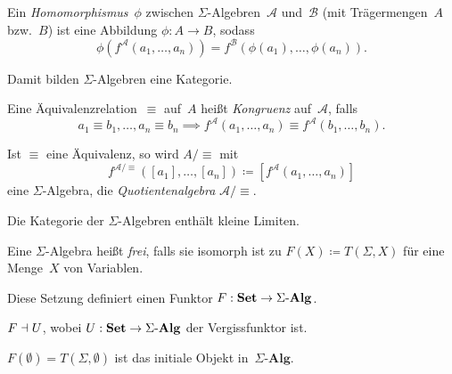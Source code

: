 \documentclass{cheat-sheet}
\renewcommand{\Alg}{\mathcal{A}} %
\newcommand{\SigmaAlgC}{\text{$\Sigma$-$\mathbf{Alg}$}} %
\begin{document}
\begin{defn}
  Ein \textit{Homomorphismus}~$\phi$ zwischen $\Sigma$-Algebren~$\Alg$ und~$\mathcal{B}$ (mit Trägermengen~$A$ bzw.~$B$) ist eine Abbildung $\phi : A \to B$, sodass
  \[
    \phi(f^\Alg(a_1, \ldots, a_n)) = f^\mathcal{B}(\phi(a_1), \ldots, \phi(a_n)).
  \]
\end{defn}

\begin{bem}
  Damit bilden $\Sigma$-Algebren eine Kategorie.
\end{bem}

\begin{defn}
  Eine Äquivalenzrelation~$\equiv$ auf~$A$ heißt \emph{Kongruenz} auf~$\Alg$, falls
  \[
    a_1 \equiv b_1, \ldots, a_n \equiv b_n \implies f^\Alg(a_1, \ldots, a_n) \equiv f^\Alg(b_1, \ldots, b_n).
  \]
\end{defn}

\begin{lemdefn}
  Ist $\equiv$ eine Äquivalenz, so wird $A/\equiv$ mit
  \[
    f^{\Alg/\equiv}([a_1], \ldots, [a_n]) \coloneqq [f^\Alg(a_1, \ldots, a_n)]
  \]
  eine $\Sigma$-Algebra, die \emph{Quotientenalgebra} $\Alg/\equiv$.
\end{lemdefn}


\begin{lem}
  Die Kategorie der $\Sigma$-Algebren enthält kleine Limiten.
\end{lem}


\begin{defn}
  Eine $\Sigma$-Algebra heißt \emph{frei}, falls sie isomorph ist zu $F(X) \coloneqq T(\Sigma, X)$ für eine Menge~$X$ von Variablen.
\end{defn}

\begin{bem}
  Diese Setzung definiert einen Funktor $F : \SetC \to \SigmaAlgC$.
\end{bem}

\begin{lem}
  $F \dashv U$, wobei $U : \SetC \to \SigmaAlgC$ der Vergissfunktor ist.
\end{lem}

\begin{kor}
  $F(\emptyset) = T(\Sigma, \emptyset)$ ist das initiale Objekt in~$\SigmaAlgC$.
\end{kor}
\end{document}
